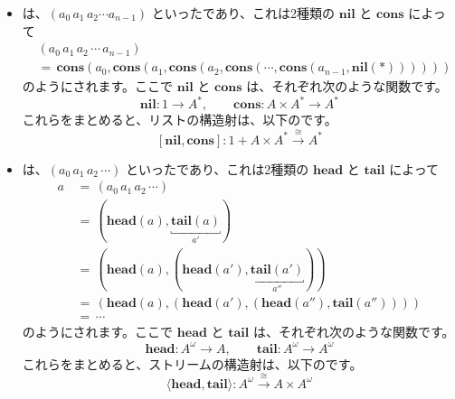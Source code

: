 \documentclass[
		head_space=20mm,
		foot_space=20mm,
		gutter=10mm,
		line_length=190mm
]{jlreq}
\begin{document}
\begin{itemize}
	\item {}は、$(a_0\,a_1\,a_2\cdots a_{n-1})$ といったであり、これは2種類の $\mathrm{\mathbf{nil}}$ と $\mathrm{\mathbf{cons}}$ によって
	\begin{align*}
		&(a_0\,a_1\,a_2\,\cdots\,a_{n-1})\\&=\,\mathrm{\mathbf{cons}}(a_0,\mathrm{\mathbf{cons}}(a_1,\mathrm{\mathbf{cons}}(a_2,\mathrm{\mathbf{cons}}(\cdots,\mathrm{\mathbf{cons}}(a_{n-1},\mathrm{\mathbf{nil}}(\ast))))))
	\end{align*}
	のようにされます。ここで $\mathrm{\mathbf{nil}}$ と $\mathrm{\mathbf{cons}}$ は、それぞれ次のような関数です。
	\[\mathrm{\mathbf{nil}}:1\to A^\ast, \qquad \mathrm{\mathbf{cons}}:A\times A^\ast\to A^\ast\]
	これらをまとめると、リストの構造射は、以下のです。
	\[[\mathrm{\mathbf{nil}},\mathrm{\mathbf{cons}}]:1+A\times A^\ast\xrightarrow{\;\cong\;} A^\ast\]
	\item {}は、$(a_0\,a_1\,a_2\,\cdots)$ といったであり、これは2種類の $\mathrm{\mathbf{head}}$ と $\mathrm{\mathbf{tail}}$ によって
	\begin{align*}
		a&\,=\, (a_0\,a_1\,a_2\,\cdots)\\
		&\,=\, (\mathrm{\mathbf{head}}(a),\underbracket{\mathrm{\mathbf{tail}}(a)}_{a'})\\
		&\,=\, (\mathrm{\mathbf{head}}(a),(\mathrm{\mathbf{head}}(a'),\underbracket{\mathrm{\mathbf{tail}}(a')}_{a''})) \\
		&\,=\, (\mathrm{\mathbf{head}}(a),(\mathrm{\mathbf{head}}(a'),(\mathrm{\mathbf{head}}(a''),\mathrm{\mathbf{tail}}(a''))))\\
		&\,=\,\cdots
	\end{align*}
	のようにされます。ここで $\mathrm{\mathbf{head}}$ と $\mathrm{\mathbf{tail}}$ は、それぞれ次のような関数です。
	\[\mathrm{\mathbf{head}}:A^\omega\to A,\qquad \mathrm{\mathbf{tail}}:A^\omega\to A^\omega\]
	これらをまとめると、ストリームの構造射は、以下のです。
	\[\langle\mathrm{\mathbf{head}},\mathrm{\mathbf{tail}}\rangle:A^\omega\xrightarrow{\;\cong\;} A\times A^\omega\]
\end{itemize}
\end{document}
